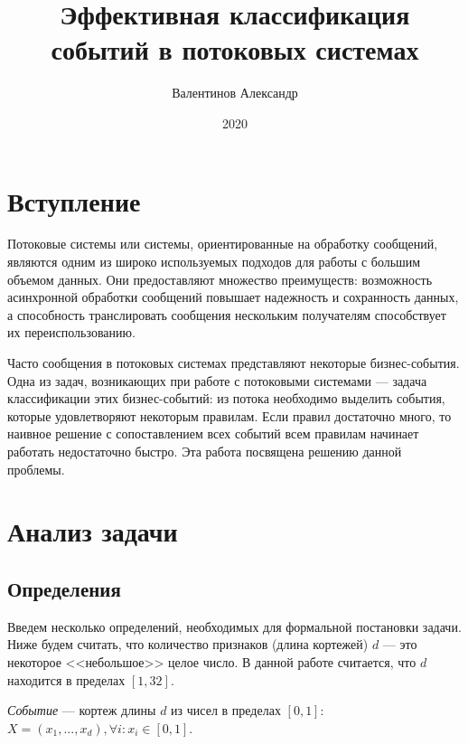 \documentclass[14pt]{article}
\title{Эффективная классификация событий в потоковых системах}
\author{Валентинов Александр}
\date{2020}
\begin{document}
\clearpage
\maketitle
\thispagestyle{empty}
\clearpage
\tableofcontents
\clearpage
\section{Вступление}
Потоковые системы или системы, ориентированные на обработку сообщений, являются одним из широко используемых подходов для работы с большим объемом данных. Они предоставляют множество преимуществ: возможность асинхронной обработки сообщений повышает надежность и сохранность данных, а способность транслировать сообщения нескольким получателям способствует их переиспользованию.

Часто сообщения в потоковых системах представляют некоторые бизнес-события. Одна из задач, возникающих при работе с потоковыми системами --- задача классификации этих бизнес-событий: из потока необходимо выделить события, которые удовлетворяют некоторым правилам. Если правил достаточно много, то наивное решение с сопоставлением всех событий всем правилам начинает работать недостаточно быстро. Эта работа посвящена решению данной проблемы.

\section{Анализ задачи}
\subsection{Определения}
Введем несколько определений, необходимых для формальной постановки задачи.
Ниже будем считать, что количество признаков (длина кортежей) $d$ --- это некоторое <<небольшое>> целое число.
В данной работе считается, что $d$ находится в пределах $[1, 32]$.

\emph{Событие} --- кортеж длины $d$ из чисел в пределах $[0, 1]$: $X = (x_1,...,x_d), \forall i: x_i \in [0, 1]$.
\end{document}
